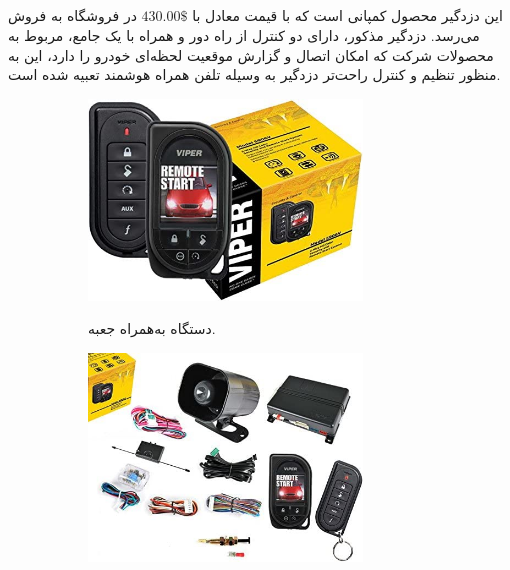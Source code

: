 \documentclass[a4paper,12pt]{report}
\begin{document}
	\subsection{
	}\label{subsec1:sec3:chap1}
	این دزدگیر محصول کمپانی
	است که با قیمت معادل با
	$430.00\$$
	در فروشگاه
		به فروش می‌رسد.
	دزدگیر مذکور، دارای دو کنترل از راه دور و همراه با یک
	جامع، مربوط به محصولات شرکت
		که امکان اتصال و گزارش موقعیت لحظه‌ای خودرو را دارد، این
	به منظور تنظیم و کنترل راحت‌تر دزدگیر به وسیله تلفن همراه هوشمند تعبیه شده است.
	\cite{ViperCar35:online}
	\begin{figure}[!h]
		\centering
		\footnotesize
		\begin{subfigure}[t]{0.3\linewidth}
			\centering
			\includegraphics[width=0.8\textwidth]{resources/viper_5906V_1.jpg}
			\label{subfig1:fig1:sec3:chap1}
			\caption{
				دستگاه
				به‌همراه جعبه.
			}
		\end{subfigure}
		\hspace*{1cm}
		\begin{subfigure}[t]{0.3\linewidth}
			\centering
			\includegraphics[width=0.8\textwidth]{resources/viper_5906V_2.jpg}

\end{subfigure}
\end{figure}
\end{document}
